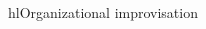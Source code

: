 \documentclass[a4paper]{article}
\begin{document}
\begin{multicols*}{2}
\begin{footnotesize}
hl{Organizational improvisation} 
\end{footnotesize}
\end{multicols*}
\end{document}
